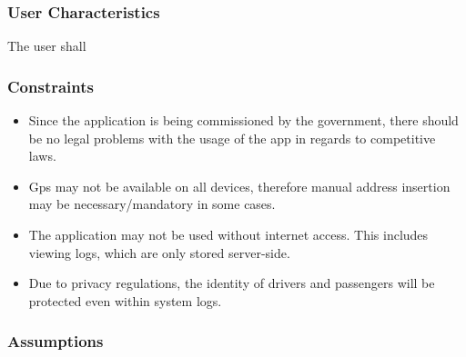 	\subsubsection{User Characteristics}
		The user shall %
	\subsubsection{Constraints}
		\begin{itemize}
			\item Since the application is being commissioned by the government, there should be no legal problems with the usage of the app in regards
			to competitive laws.
			\item Gps may not be available on all devices, therefore manual address insertion may be necessary/mandatory in some cases.
			\item The application may not be used without internet access. This includes viewing logs, which are only stored server-side.
			\item Due to privacy regulations, the identity of drivers and passengers will be protected even within system logs.
		\end{itemize}
	\subsubsection{Assumptions}	
	
